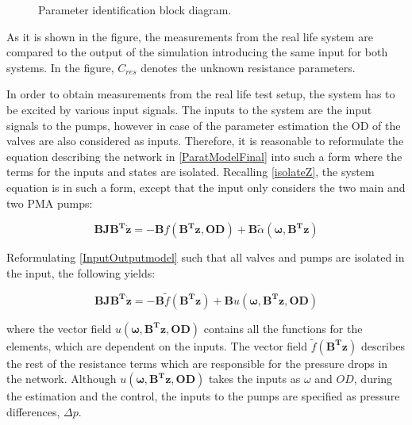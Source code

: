 \begin{figure}[H]
\centering
 
\caption{Parameter identification block diagram. }
\label{fig:parame_block}
\end{figure}

As it is shown in the figure, the measurements from the real life system are compared to the output of the simulation introducing the same input for both systems. In the figure, $C_{res}$ denotes the unknown resistance parameters.

In order to obtain measurements from the real life test setup, the system has to be excited by various input signals. The inputs to the system are the input signals to the pumps, however in case of the parameter estimation the OD of the valves are also considered as inputs. Therefore, it is reasonable to reformulate the equation describing the network in \eqref{ParatModelFinal} into such a form where the terms for the inputs and states are isolated. Recalling \eqref{isolateZ}, the system equation is in such a form, except that the input only considers the two main and two PMA pumps: 

\begin{equation}
\bm{B} \bm{J} \bm{B^T} \bm{\dot{z}} = - \bm{B} f(\bm{B^T}\bm{z}, \bm{OD}) + \bm{B}\tilde{\alpha} (\bm{\omega},\bm{B^T}\bm{z}) 
 \label{InputOutputmodel}
\end{equation}

Reformulating \eqref{InputOutputmodel} such that all valves and pumps are isolated in the input, the following yields:

\begin{equation}
\bm{B} \bm{J} \bm{B^T} \bm{\dot{z}} = - \bm{B} \tilde f(\bm{B^T}\bm{z}) + \bm{B} u(\bm{\omega},\bm{B^T}\bm{z},\bm{OD}) 
 \label{InputOutputmodel2}
\end{equation}

where the vector field $u(\bm{\omega},\bm{B^T}\bm{z},\bm{OD})$ contains all the functions for the elements, which are dependent on the inputs. The vector field $\tilde f(\bm{B^T}\bm{z})$ describes the rest of the resistance terms which are responsible for the pressure drops in the network. Although $u(\bm{\omega},\bm{B^T}\bm{z},\bm{OD})$ takes the inputs as $\omega$ and $OD$, during the estimation and the control, the inputs to the pumps are specified as pressure differences, $\Delta p$.

